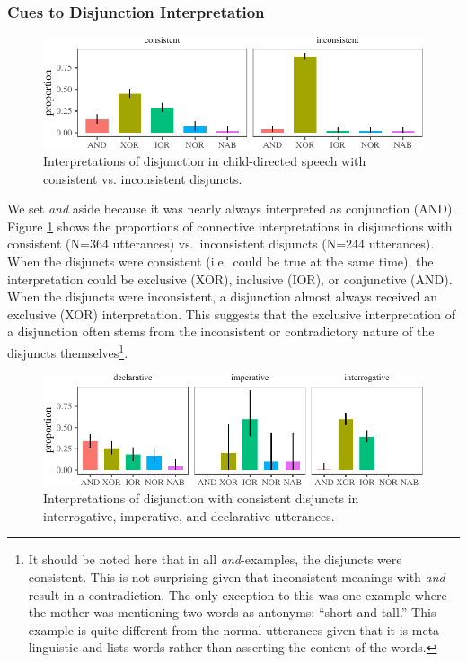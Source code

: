 \documentclass[
  english,
  ,man,floatsintext]{apa6}
\begin{document}
\hypertarget{cues-to-disjunction-interpretation}{%
\subsubsection{Cues to Disjunction Interpretation}\label{cues-to-disjunction-interpretation}}

\begin{figure}[tb]

{\centering \includegraphics{figs/consistencyPlot-1} 

}

\caption{Interpretations of disjunction in child-directed speech with consistent vs. inconsistent disjuncts.}\label{fig:consistencyPlot}
\end{figure}

We set \emph{and} aside because it was nearly always interpreted as conjunction (AND). Figure \ref{fig:consistencyPlot} shows the proportions of connective interpretations in disjunctions with consistent (N=364 utterances) vs.~inconsistent disjuncts (N=244 utterances). When the disjuncts were consistent (i.e.~could be true at the same time), the interpretation could be exclusive (XOR), inclusive (IOR), or conjunctive (AND). When the disjuncts were inconsistent, a disjunction almost always received an exclusive (XOR) interpretation. This suggests that the exclusive interpretation of a disjunction often stems from the inconsistent or contradictory nature of the disjuncts themselves\footnote{It should be noted here that in all \emph{and}-examples, the disjuncts were consistent. This is not surprising given that inconsistent meanings with \emph{and} result in a contradiction. The only exception to this was one example where the mother was mentioning two words as antonyms: ``short and tall.'' This example is quite different from the normal utterances given that it is meta-linguistic and lists words rather than asserting the content of the words.}.

\begin{figure}[tb]

{\centering \includegraphics{figs/utterancePlot-1} 

}

\caption{Interpretations of disjunction with consistent disjuncts in interrogative, imperative, and declarative utterances.}\label{fig:utterancePlot}
\end{figure}
\end{document}
